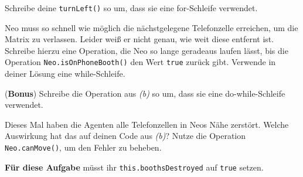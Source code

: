             \subexcercise Schreibe deine \texttt{turnLeft()} so um, dass sie eine for-Schleife verwendet.

            \subexcercise Neo muss so schnell wie möglich die nächstgelegene Telefonzelle erreichen, um die Matrix zu verlassen. Leider weiß er nicht genau, wie weit diese entfernt ist. Schreibe hierzu eine Operation, die Neo so lange geradeaus laufen lässt, bis die Operation \texttt{Neo.isOnPhoneBooth()} den Wert \texttt{true} zurück gibt. Verwende in deiner Lösung eine while-Schleife.

            \subexcercise(\textbf{Bonus}) Schreibe die Operation aus \textit{(b)} so um, dass sie eine do-while-Schleife verwendet.

            \subexcercise Dieses Mal haben die Agenten alle Telefonzellen in Neos Nähe zerstört. Welche Auswirkung hat das auf deinen Code aus \textit{(b)}? Nutze die Operation \texttt{Neo.canMove()}, um den Fehler zu beheben.

            \textbf{Für diese Aufgabe} müsst ihr \texttt{this.boothsDestroyed} auf \texttt{true} setzen.

